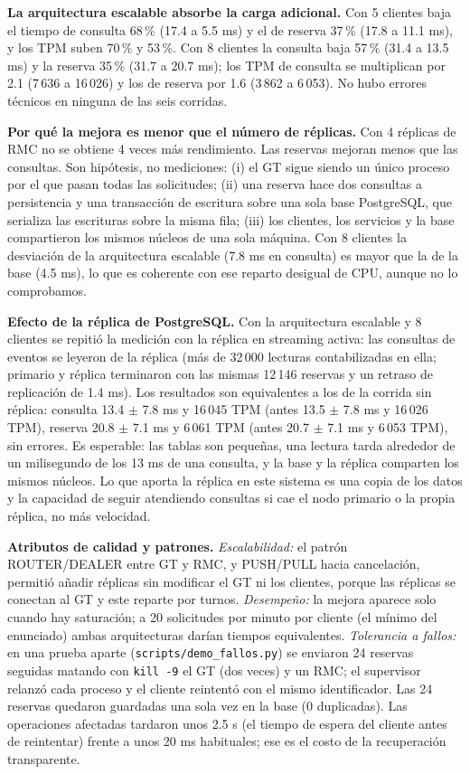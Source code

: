 \documentclass[10pt, a4paper]{article}
\begin{document}
\textbf{La arquitectura escalable absorbe la carga adicional.} Con 5 clientes baja el tiempo de consulta 68\,\% (17.4 a 5.5 ms) y el de reserva 37\,\% (17.8 a 11.1 ms), y los TPM suben 70\,\% y 53\,\%. Con 8 clientes la consulta baja 57\,\% (31.4 a 13.5 ms) y la reserva 35\,\% (31.7 a 20.7 ms); los TPM de consulta se multiplican por 2.1 (7\,636 a 16\,026) y los de reserva por 1.6 (3\,862 a 6\,053). No hubo errores técnicos en ninguna de las seis corridas.

\textbf{Por qué la mejora es menor que el número de réplicas.} Con 4 réplicas de RMC no se obtiene 4 veces más rendimiento. Las reservas mejoran menos que las consultas. Son hipótesis, no mediciones: (i) el GT sigue siendo un único proceso por el que pasan todas las solicitudes; (ii) una reserva hace dos consultas a persistencia y una transacción de escritura sobre una sola base PostgreSQL, que serializa las escrituras sobre la misma fila; (iii) los clientes, los servicios y la base compartieron los mismos núcleos de una sola máquina. Con 8 clientes la desviación de la arquitectura escalable (7.8 ms en consulta) es mayor que la de la base (4.5 ms), lo que es coherente con ese reparto desigual de CPU, aunque no lo comprobamos.

\textbf{Efecto de la réplica de PostgreSQL.} Con la arquitectura escalable y 8 clientes se repitió la medición con la réplica en streaming activa: las consultas de eventos se leyeron de la réplica (más de 32\,000 lecturas contabilizadas en ella; primario y réplica terminaron con las mismas 12\,146 reservas y un retraso de replicación de 1.4 ms). Los resultados son equivalentes a los de la corrida sin réplica: consulta 13.4 $\pm$ 7.8 ms y 16\,045 TPM (antes 13.5 $\pm$ 7.8 ms y 16\,026 TPM), reserva 20.8 $\pm$ 7.1 ms y 6\,061 TPM (antes 20.7 $\pm$ 7.1 ms y 6\,053 TPM), sin errores. Es esperable: las tablas son pequeñas, una lectura tarda alrededor de un milisegundo de los 13 ms de una consulta, y la base y la réplica comparten los mismos núcleos. Lo que aporta la réplica en este sistema es una copia de los datos y la capacidad de seguir atendiendo consultas si cae el nodo primario o la propia réplica, no más velocidad.

\textbf{Atributos de calidad y patrones.} \emph{Escalabilidad:} el patrón ROUTER/DEALER entre GT y RMC, y PUSH/PULL hacia cancelación, permitió añadir réplicas sin modificar el GT ni los clientes, porque las réplicas se conectan al GT y este reparte por turnos. \emph{Desempeño:} la mejora aparece solo cuando hay saturación; a 20 solicitudes por minuto por cliente (el mínimo del enunciado) ambas arquitecturas darían tiempos equivalentes. \emph{Tolerancia a fallos:} en una prueba aparte (\texttt{scripts/demo\_fallos.py}) se enviaron 24 reservas seguidas matando con \texttt{kill -9} el GT (dos veces) y un RMC; el supervisor relanzó cada proceso y el cliente reintentó con el mismo identificador. Las 24 reservas quedaron guardadas una sola vez en la base (0 duplicadas). Las operaciones afectadas tardaron unos 2.5 s (el tiempo de espera del cliente antes de reintentar) frente a unos 20 ms habituales; ese es el costo de la recuperación transparente.
\end{document}
